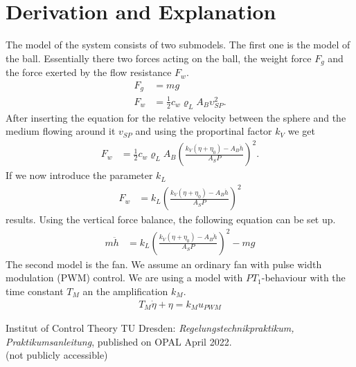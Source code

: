 \documentclass[10pt,a4paper]{article}
\begin{document}
	\section{Derivation and Explanation} %
	The model of the system consists of two submodels. The first one is the model of the ball. Essentially there two forces acting on the ball, the weight force $F_g$ and the force exerted by the flow resistance $F_w$.   
	\begin{align}
		F_g &= mg \\
		F_w &= \frac{1}{2} c_w \varrho_L A_B \upsilon_{SP}^2.
	\end{align}
	After inserting the equation for the relative velocity between the sphere and the medium flowing around it $v_{SP}$ and using the proportinal factor $k_V$ we get
	\begin{align}
		F_w &= \frac{1}{2} c_w \varrho_L A_B \left(\frac{k_V(\eta + \eta_0) - A_B \dot{h}}{A_SP}\right)^2.
	\end{align}
	If we now introduce the parameter $k_L$ 
	\begin{align}
		F_w &= k_L \left(\frac{k_V(\eta +\eta_0) - A_B\dot{h}}{A_SP}\right)^2
	\end{align} 
	results.
	Using the vertical force balance, the following equation can be set up.
	\begin{align}
		m\ddot{h}&= k_L \left(\frac{k_V(\eta +\eta_0) - A_B\dot{h}}{A_SP}\right)^2 -mg
	\end{align}
	The second model is the fan. We assume an ordinary fan with pulse width modulation (PWM) control. We are using a model with $PT_1$-behaviour with the time constant $T_M$ an the amplification $k_M$.
	\begin{align}
		T_M \dot{\eta} + \eta = k_Mu_{PWM}
	\end{align}    
	
	\begin{thebibliography}{10}		
		Institut of Control Theory TU Dresden: 
		\textit{Regelungstechnikpraktikum, Praktikumsanleitung}, published on OPAL April 2022. \\
		(not publicly accessible)
		
	\end{thebibliography}
\end{document}
